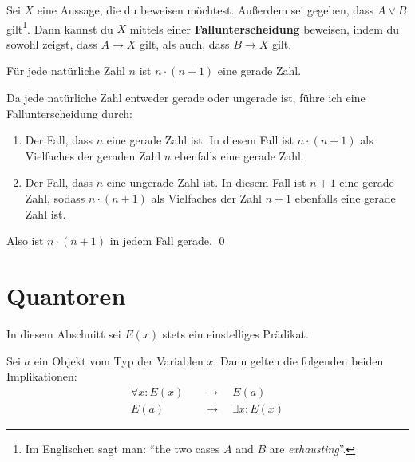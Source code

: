 \begin{axiom} \label{fallunterscheidung} 
    Sei $X$ eine Aussage, die du beweisen möchtest. Außerdem sei gegeben, dass $A\lor B$ gilt\footnote{Im Englischen sagt man: ``the two cases $A$ and $B$ are \emph{exhausting}''.}. Dann kannst du $X$ mittels einer \textbf{Fallunterscheidung} beweisen, indem du sowohl zeigst, dass $A\to X$ gilt, als auch, dass $B\to X$ gilt.
\end{axiom}


\begin{bsp} \label{bsp:fallunterscheidung}
    Für jede natürliche Zahl $n$ ist $n\cdot (n+1)$ eine gerade Zahl.
\end{bsp}


\begin{bew}
    Da jede natürliche Zahl entweder gerade oder ungerade ist, führe ich eine Fallunterscheidung durch:
    \begin{enumerate}[1)]
        \item Der Fall, dass $n$ eine gerade Zahl ist. In diesem Fall ist $n\cdot (n+1)$ als Vielfaches der geraden Zahl $n$ ebenfalls eine gerade Zahl.
        \item Der Fall, dass $n$ eine ungerade Zahl ist. In diesem Fall ist $n+1$ eine gerade Zahl, sodass $n\cdot (n+1)$ als Vielfaches der Zahl $n+1$ ebenfalls eine gerade Zahl ist.
    \end{enumerate}
    Also ist $n\cdot(n+1)$ in jedem Fall gerade. \qed
\end{bew}





\section{Quantoren}


In diesem Abschnitt sei $E(x)$ stets ein einstelliges Prädikat.


\begin{axiom}[*] \label{quantorenaxiom}
    Sei $a$ ein Objekt vom Typ der Variablen $x$. Dann gelten die folgenden beiden Implikationen:
    \begin{align*}
         \forall x: E(x) \quad& \to\quad E(a) \\
         E(a) \quad & \to\quad \exists x: E(x)
    \end{align*}
\end{axiom}

